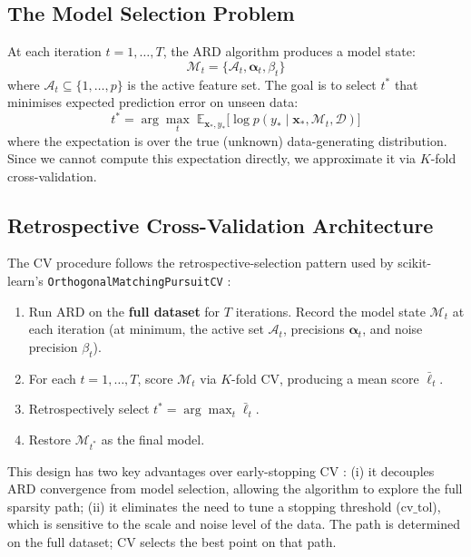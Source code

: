 \documentclass[11pt,a4paper]{article}
\begin{document}
\subsection{The Model Selection Problem}

At each iteration $t = 1,\dots,T$, the ARD algorithm produces a model state:
\begin{equation}
\mathcal{M}_t = \{\mathcal{A}_t, \boldsymbol{\alpha}_t, \beta_t\}
\label{eq:model_state}
\end{equation}
where $\mathcal{A}_t \subseteq \{1,\dots,p\}$ is the active feature set. The goal is to select $t^*$ that minimises expected prediction error on unseen data:
\begin{equation}
t^* = \arg\max_t \; \mathbb{E}_{\mathbf{x}_*, y_*} \bigl[ \log p(y_* \mid \mathbf{x}_*, \mathcal{M}_t, \mathcal{D}) \bigr]
\label{eq:objective}
\end{equation}
where the expectation is over the true (unknown) data-generating distribution. Since we cannot compute this expectation directly, we approximate it via $K$-fold cross-validation.

\subsection{Retrospective Cross-Validation Architecture}

The CV procedure follows the retrospective-selection pattern used by scikit-learn's \texttt{OrthogonalMatchingPursuitCV} \citep{scikit-learn}:

\begin{enumerate}
\item Run ARD on the \textbf{full dataset} for $T$ iterations. Record the model state $\mathcal{M}_t$ at each iteration (at minimum, the active set $\mathcal{A}_t$, precisions $\boldsymbol{\alpha}_t$, and noise precision $\beta_t$).
\item For each $t = 1,\dots,T$, score $\mathcal{M}_t$ via $K$-fold CV, producing a mean score $\bar{\ell}_t$.
\item Retrospectively select $t^* = \arg\max_t \bar{\ell}_t$.
\item Restore $\mathcal{M}_{t^*}$ as the final model.
\end{enumerate}

This design has two key advantages over early-stopping CV \citep{prechelt1998}: (i) it decouples ARD convergence from model selection, allowing the algorithm to explore the full sparsity path; (ii) it eliminates the need to tune a stopping threshold ($\text{cv\_tol}$), which is sensitive to the scale and noise level of the data. The path is determined on the full dataset; CV selects the best point on that path.
\end{document}
